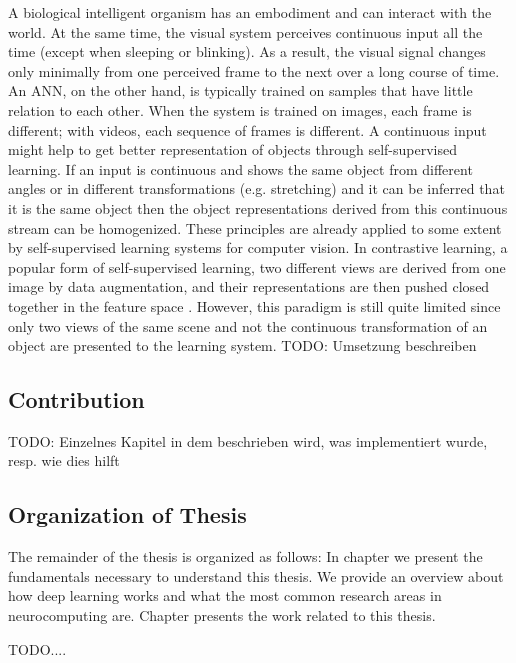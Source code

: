 A biological intelligent organism has an embodiment and can interact with the world.
At the same time, the visual system perceives continuous input all the time (except when sleeping or blinking).
As a result, the visual signal changes only minimally from one perceived frame to the next over a long course of time.
An ANN, on the other hand, is typically trained on samples that have little relation to each other.
When the system is trained on images, each frame is different; with videos, each sequence of frames is different.
A continuous input might help to get better representation of objects through self-supervised learning.
If an input is continuous and shows the same object from different angles or in different transformations (e.g. stretching) and it can be inferred that it is the same object then the object representations derived from this continuous stream can be homogenized.
These principles are already applied to some extent by self-supervised learning systems for computer vision.
In contrastive learning, a popular form of self-supervised learning, two different views are derived from one image by data augmentation, and their representations are then pushed closed together in the feature space .
However, this paradigm is still quite limited since only two views of the same scene and not the continuous transformation of an object are presented to the learning system.
TODO: Umsetzung beschreiben

\subsection{Contribution}
TODO: Einzelnes Kapitel in dem beschrieben wird, was implementiert wurde, resp. wie dies hilft

\subsection{Organization of Thesis}
The remainder of the thesis is organized as follows: In chapter  we present the fundamentals necessary to understand this thesis. We provide an overview about how deep learning works and what the most common research areas in neurocomputing are. Chapter  presents the work related to this thesis.

TODO....



